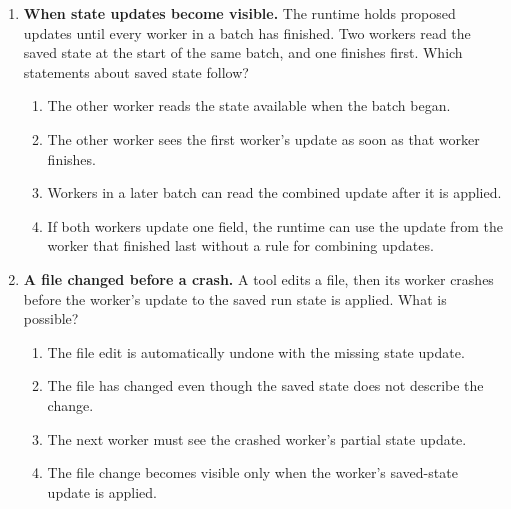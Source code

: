 \begin{enumerate}[start=31,itemsep=0.7\baselineskip]
\item\label{exercise:31} \begin{minipage}[t]{\linewidth}
\textbf{When state updates become visible.} The runtime holds proposed updates until every worker in a batch has finished. Two workers read the saved state at the start of the same batch, and one finishes first. Which statements about saved state follow?
\begin{enumerate}[label=\textnormal{(\Alph*)},leftmargin=*,itemsep=0pt]
\item The other worker reads the state available when the batch began.
\item The other worker sees the first worker's update as soon as that worker finishes.
\item Workers in a later batch can read the combined update after it is applied.
\item If both workers update one field, the runtime can use the update from the worker that finished last without a rule for combining updates.
\end{enumerate}
\end{minipage}

\item\label{exercise:32} \begin{minipage}[t]{\linewidth}
\textbf{A file changed before a crash.} A tool edits a file, then its worker crashes before the worker's update to the saved run state is applied. What is possible?
\begin{enumerate}[label=\textnormal{(\Alph*)},leftmargin=*,itemsep=0pt]
\item The file edit is automatically undone with the missing state update.
\item The file has changed even though the saved state does not describe the change.
\item The next worker must see the crashed worker's partial state update.
\item The file change becomes visible only when the worker's saved-state update is applied.
\end{enumerate}
\end{minipage}


\end{enumerate}
